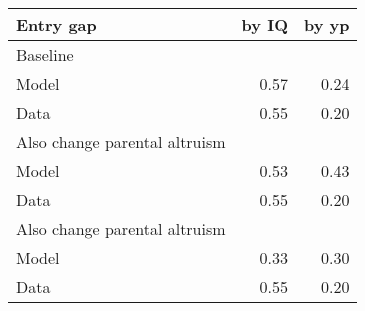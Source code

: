 \begin{tabular}{lrr}
\hline
Entry gap & by IQ  & by yp  \\
\hline
Baseline &   &   \\
Model & 0.57  & 0.24  \\
Data & 0.55  & 0.20  \\
Also change parental altruism &   &   \\
Model & 0.53  & 0.43  \\
Data & 0.55  & 0.20  \\
Also change parental altruism &   &   \\
Model & 0.33  & 0.30  \\
Data & 0.55  & 0.20  \\
\hline
\end{tabular}%
